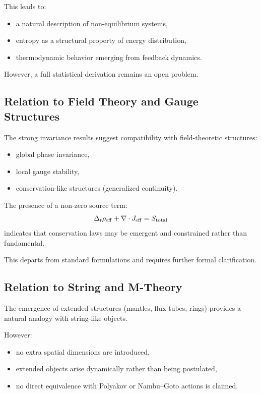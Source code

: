 \documentclass[11pt]{article}
\begin{document}
This leads to:
\begin{itemize}
\item a natural description of non-equilibrium systems,
\item entropy as a structural property of energy distribution,
\item thermodynamic behavior emerging from feedback dynamics.
\end{itemize}

However, a full statistical derivation remains an open problem.

\subsection{Relation to Field Theory and Gauge Structures}

The strong invariance results suggest compatibility with field-theoretic structures:

\begin{itemize}
\item global phase invariance,
\item local gauge stability,
\item conservation-like structures (generalized continuity).
\end{itemize}

The presence of a non-zero source term:
\begin{equation}
\Delta_t \rho_{\rm eff} + \nabla \cdot J_{\rm eff} = S_{\rm total}
\end{equation}
indicates that conservation laws may be emergent and constrained rather than fundamental.

This departs from standard formulations and requires further formal clarification.

\subsection{Relation to String and M-Theory}

The emergence of extended structures (mantles, flux tubes, rings) provides a natural analogy with string-like objects.

However:
\begin{itemize}
\item no extra spatial dimensions are introduced,
\item extended objects arise dynamically rather than being postulated,
\item no direct equivalence with Polyakov or Nambu--Goto actions is claimed.
\end{itemize}
\end{document}
